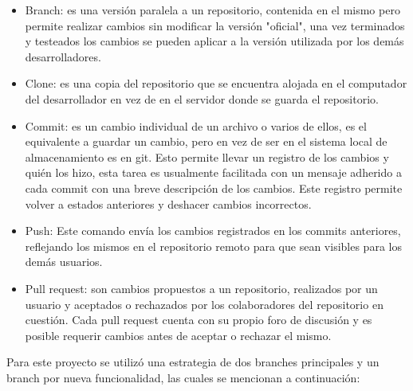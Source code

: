 \begin{itemize}

\item Branch: es una versión paralela a un repositorio, contenida en el mismo pero permite realizar cambios sin modificar la versión "oficial", una vez terminados y testeados los cambios se pueden aplicar a la versión utilizada por los demás desarrolladores.

\item Clone: es una copia del repositorio que se encuentra alojada en el computador del desarrollador en vez de en el servidor donde se guarda el repositorio.

\item Commit: es un cambio individual de un archivo o varios de ellos, es el equivalente a guardar un cambio, pero en vez de ser en el sistema local de almacenamiento es en git. Esto permite llevar un registro de los cambios y quién los hizo, esta tarea es usualmente facilitada con un mensaje adherido a cada commit con una breve descripción de los cambios. Este registro permite volver a estados anteriores y deshacer cambios incorrectos.

\item Push: Este comando envía los cambios registrados en los commits anteriores, reflejando los mismos en el repositorio remoto para que sean visibles para los demás usuarios.

\item Pull request: son cambios propuestos a un repositorio, realizados por un usuario y aceptados o rechazados por los colaboradores del repositorio en cuestión. Cada pull request cuenta con su propio foro de discusión y es posible requerir cambios antes de aceptar o rechazar el mismo.

\end{itemize}

Para este proyecto se utilizó una estrategia de dos branches principales y un branch por nueva funcionalidad, las cuales se mencionan a continuación:

